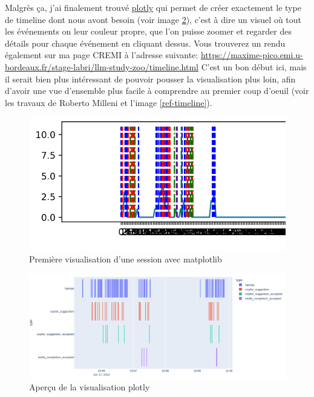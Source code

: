 Malgrès ça, j'ai finalement trouvé \href{https://plotly.com/python/}{plotly} qui permet de créer exactement le type de timeline dont nous avont besoin (voir image \ref{cool-plot}),
c'est à dire un visuel où tout les événements on leur couleur propre, que l'on puisse zoomer et regarder des détails pour chaque événement en cliquant dessus.
Vous trouverez un rendu également sur ma page CREMI à l'adresse suivante: \url{https://maxime-pico.emi.u-bordeaux.fr/stage-labri/llm-study-zoo/timeline.html}
C'est un bon début ici, mais il serait bien plus intéressant de pouvoir pousser la visualisation plus loin, afin d'avoir une vue d'ensemble plus facile à comprendre au premier coup d'oeuil
(voir les travaux de Roberto Milleni \cite{cool-plot} et l'image \ref{ref-timeline}).

\begin{figure}
  \centering
  \includegraphics[width=15cm]{images/matplotlib-timeline.png}
  \caption{Première visualisation d'une session avec matplotlib}
  \label{matplotlib-timeline}
\end{figure}

\begin{figure}
  \centering
  \includegraphics[width=15cm]{images/cool-plot.png}
  \caption{Aperçu de la visualisation plotly}
  \label{cool-plot}
\end{figure}

